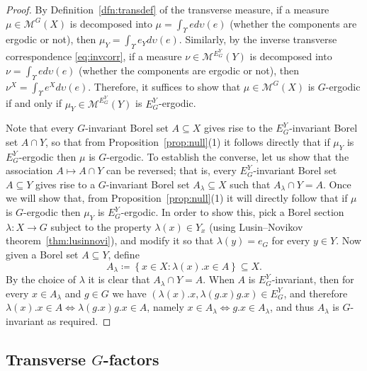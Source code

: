 \documentclass{amsart}
\numberwithin{equation}{subsection}
\theoremstyle{remark}
\begin{document}
\begin{proof}
By Definition~\ref{dfn:transdef} of the transverse measure, if a measure \(\mu\in\mathcal{M}^{G}\left(X\right)\) is decomposed into \(\mu=\int_{\Upsilon}ed\upsilon\left(e\right)\) (whether the components are ergodic or not), then \(\mu_{Y}=\int_{\Upsilon}e_{Y}d\upsilon\left(e\right)\). Similarly, by the inverse transverse correspondence \eqref{eq:invcorr}, if a measure \(\nu\in\mathcal{M}^{E_{G}^{Y}}\left(Y\right)\) is decomposed into \(\nu=\int_{\Upsilon}ed\upsilon\left(e\right)\) (whether the components are ergodic or not), then \(\nu^{X}=\int_{\Upsilon}e^{X}d\upsilon\left(e\right)\). Therefore, it suffices to show that \(\mu\in\mathcal{M}^{G}\left(X\right)\) is \(G\)-ergodic if and only if \(\mu_{Y}\in\mathcal{M}^{E_{G}^{Y}}\left(Y\right)\) is \(E_{G}^{Y}\)-ergodic.

Note that every \(G\)-invariant Borel set \(A\subseteq X\) gives rise to the \(E_{G}^{Y}\)-invariant Borel set \(A\cap Y\), so that from Proposition~\ref{prop:null}(1) it follows directly that if \(\mu_{Y}\) is \(E_{G}^{Y}\)-ergodic then \(\mu\) is \(G\)-ergodic. To establish the converse, let us show that the association \(A\mapsto A\cap Y\) can be reversed; that is, every \(E_{G}^{Y}\)-invariant Borel set \(A\subseteq Y\) gives rise to a \(G\)-invariant Borel set \(A_{\lambda}\subseteq X\) such that \(A_{\lambda}\cap Y=A\). Once we will show that, from Proposition~\ref{prop:null}(1) it will directly follow that if \(\mu\) is \(G\)-ergodic then \(\mu_{Y}\) is \(E_{G}^{Y}\)-ergodic. In order to show this, pick a Borel section \(\lambda:X\to G\) subject to the property \(\lambda\left(x\right)\in Y_{x}\) (using Lusin--Novikov theorem~\ref{thm:lusinnovi}), and modify it so that \(\lambda\left(y\right)=e_{G}\) for every \(y\in Y\). Now given a Borel set \(A\subseteq Y\), define
\[A_{\lambda}\coloneqq\left\{x\in X:\lambda\left(x\right).x\in A\right\} \subseteq X.\]
By the choice of \(\lambda\) it is clear that \(A_{\lambda}\cap Y=A\). When \(A\) is \(E_{G}^{Y}\)-invariant, then for every \(x\in A_{\lambda}\) and \(g\in G\) we have \(\left(\lambda\left(x\right).x,\lambda\left(g.x\right)g.x\right)\in E_{G}^{Y}\), and therefore \(\lambda\left(x\right).x\in A\iff\lambda\left(g.x\right)g.x\in A\), namely \(x\in A_{\lambda}\iff g.x\in A_{\lambda}\), and thus \(A_{\lambda}\) is \(G\)-invariant as required.
\end{proof}

\subsection{Transverse \(G\)-factors}\label{sct:transfact}
\end{document}
